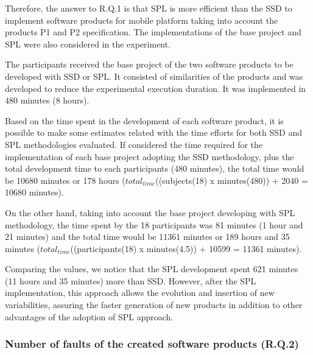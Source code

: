 \begin{itemize}
Therefore, the answer to R.Q.1 is that SPL is more efficient than the SSD to implement software products for mobile platform taking into account the products P1 and P2 specification. The implementations of the base project and SPL were also considered in the experiment.

The participants received the base project of the two software products to be developed with SSD or SPL. It consisted of similarities of the products and was developed to reduce the experimental execution duration. It was implemented in 480 minutes (8 hours).

Based on the time spent in the development of each software product, it is possible to make some estimates related with the time efforts for both SSD and SPL methodologies evaluated. If considered the time required for the implementation of each base project adopting the SSD methodology, plus the total development time to each participants (480 minutes), the total time would be 10680 minutes or 178 hours ($total_{time}$((subje\allowbreak cts(18) x minutes(480)) + 2040 = 10680 minutes). 

On the other hand, taking into account the base project developing with SPL methodology, the time spent by the 18 participants was 81 minutes (1 hour and 21 minutes) and the total time would be 11361 minutes or 189 hours and 35 minutes ($total_{time}$((participants(18) x minutes(4.5)) + 10599 = 11361 minutes). 

Comparing the values, we notice that the SPL development spent 621 minutes (11 hours and 35 minutes) more than SSD. However, after the SPL implementation, this approach allows the evolution and insertion of new variabilities, assuring the faster generation of new products in addition to other advantages of the adoption of SPL approach.

\end{itemize}

\subsubsection*{Number of faults of the created software products (R.Q.2)}


